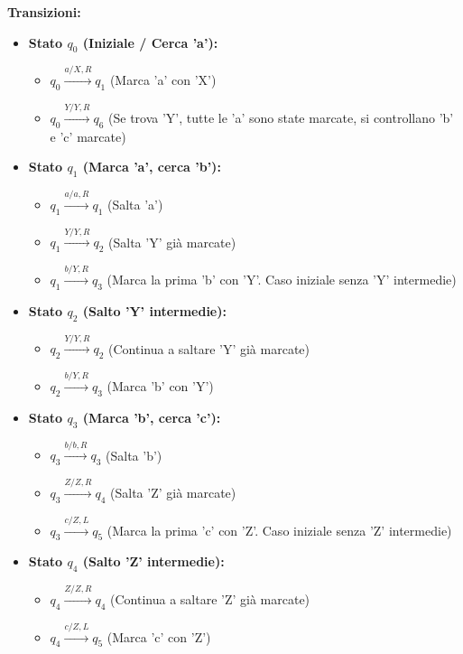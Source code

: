 \documentclass[a4paper, 11pt]{book} %
\theoremstyle{definition}
\begin{document}
\noindent \textbf{Transizioni:}
\begin{itemize}
    \item \textbf{Stato $q_0$ (Iniziale / Cerca 'a'):}
        \begin{itemize}
            \item $q_0 \xrightarrow{a / X, R} q_1$ (Marca 'a' con 'X')
            \item $q_0 \xrightarrow{Y / Y, R} q_6$ (Se trova 'Y', tutte le 'a' sono state marcate, si controllano 'b' e 'c' marcate)
        \end{itemize}
    \item \textbf{Stato $q_1$ (Marca 'a', cerca 'b'):}
        \begin{itemize}
            \item $q_1 \xrightarrow{a / a, R} q_1$ (Salta 'a')
            \item $q_1 \xrightarrow{Y / Y, R} q_2$ (Salta 'Y' già marcate)
            \item $q_1 \xrightarrow{b / Y, R} q_3$ (Marca la prima 'b' con 'Y'. Caso iniziale senza 'Y' intermedie)
        \end{itemize}
    \item \textbf{Stato $q_2$ (Salto 'Y' intermedie):}
        \begin{itemize}
            \item $q_2 \xrightarrow{Y / Y, R} q_2$ (Continua a saltare 'Y' già marcate)
            \item $q_2 \xrightarrow{b / Y, R} q_3$ (Marca 'b' con 'Y')
        \end{itemize}
    \item \textbf{Stato $q_3$ (Marca 'b', cerca 'c'):}
        \begin{itemize}
            \item $q_3 \xrightarrow{b / b, R} q_3$ (Salta 'b')
            \item $q_3 \xrightarrow{Z / Z, R} q_4$ (Salta 'Z' già marcate)
            \item $q_3 \xrightarrow{c / Z, L} q_5$ (Marca la prima 'c' con 'Z'. Caso iniziale senza 'Z' intermedie)
        \end{itemize}
    \item \textbf{Stato $q_4$ (Salto 'Z' intermedie):}
        \begin{itemize}
            \item $q_4 \xrightarrow{Z / Z, R} q_4$ (Continua a saltare 'Z' già marcate)
            \item $q_4 \xrightarrow{c / Z, L} q_5$ (Marca 'c' con 'Z')

\end{itemize}
\end{itemize}
\end{document}

